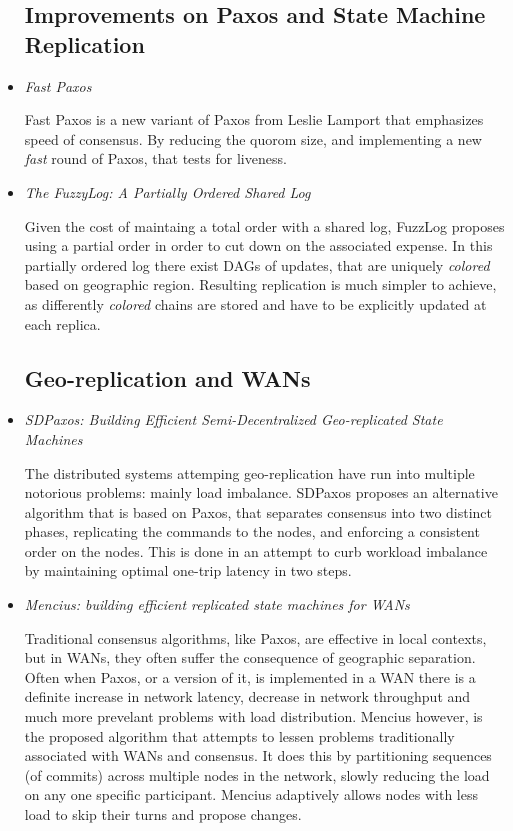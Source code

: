 \documentclass{article}
\begin{document}
\begin{itemize}

	\subsection{Improvements on Paxos and State Machine Replication}

	\item
	\textit{Fast Paxos} \cite{lamport2006fast}

	Fast Paxos is a new variant of Paxos from Leslie Lamport that emphasizes speed of consensus.
	By reducing the quorom size, and implementing a new \textit{fast} round of Paxos, that tests for liveness.

	\item
	\textit{The FuzzyLog: A Partially Ordered Shared Log} \cite{FuzzyLog}

	Given the cost of maintaing a total order with a shared log, FuzzLog proposes using a partial order in order to cut down on the associated expense.
	In this partially ordered log there exist DAGs of updates, that are uniquely \textit{colored} based on geographic region.
	Resulting replication is much simpler to achieve, as differently \textit{colored} chains are stored and have to be explicitly updated at each replica.


	\subsection{Geo-replication and WANs}

	\item
	\textit{SDPaxos: Building Efficient Semi-Decentralized Geo-replicated State Machines} \cite{zhao2018sdpaxos}

	The distributed systems attemping geo-replication have run into multiple notorious problems: mainly load imbalance.
	SDPaxos proposes an alternative algorithm that is based on Paxos, that separates consensus into two distinct phases, replicating the commands to the nodes, and enforcing a consistent order on the nodes.
	This is done in an attempt to curb workload imbalance by maintaining optimal one-trip latency in two steps.

	\item
	\textit{Mencius: building efficient replicated state machines for WANs} \cite{Mencius}

	Traditional consensus algorithms, like Paxos, are effective in local contexts, but in WANs, they often suffer the consequence of geographic separation.
	Often when Paxos, or a version of it, is implemented in a WAN there is a definite increase in network latency, decrease in network throughput and much more prevelant problems with load distribution.
	Mencius however, is the proposed algorithm that attempts to lessen problems traditionally associated with WANs and consensus.
	It does this by partitioning sequences (of commits) across multiple nodes in the network, slowly reducing the load on any one specific participant. Mencius adaptively allows nodes with less load to skip their turns and propose changes.


\end{itemize}
\end{document}
